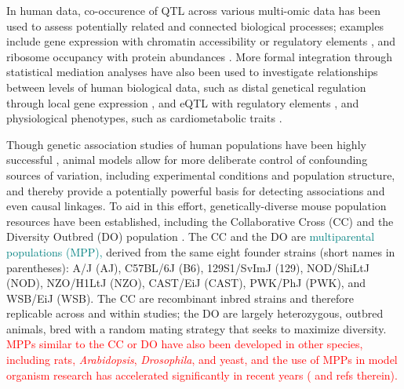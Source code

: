 \documentclass[10pt,letterpaper]{article}
\newcommand{\WVinline}[1]{\textcolor{red}{#1}}
\newcommand{\GKinline}[1]{\textcolor{teal}{#1}}
\begin{document}
In human data, co-occurence of QTL across various multi-omic data has been used to assess potentially related and connected biological processes; examples include gene expression with chromatin accessibility \cite{Degner2012} or regulatory elements \cite{Pai2015},  and ribosome occupancy with protein abundances \cite{Battle2015}.
More formal integration through statistical mediation analyses have also been used to investigate relationships between levels of human biological data, such as distal genetical regulation through local gene expression \cite{Battle2014,Yang2017}, and eQTL with regulatory elements \cite{Alasoo2017, Roytman2018, Wu2018}, and physiological phenotypes, such as cardiometabolic traits \cite{Raulerson2019}.

Though genetic association studies of human populations have been highly successful \cite{Visscher2017}, animal models allow for more deliberate control of confounding sources of variation, including experimental conditions and population structure, and thereby provide a potentially powerful basis for detecting associations and even causal linkages.
To aid in this effort, genetically-diverse mouse population resources have been established, including the Collaborative Cross (CC) \cite{Churchill2004,Hall2012,Srivastava2017} and the Diversity Outbred (DO) population \cite{Churchill2012}. The CC and the DO are \GKinline{multiparental populations (MPP),} derived from the same eight founder strains (short names in parentheses): A/J (AJ), C57BL/6J (B6), 129S1/SvImJ (129), NOD/ShiLtJ (NOD), NZO/H1LtJ (NZO), CAST/EiJ (CAST), PWK/PhJ (PWK), and WSB/EiJ (WSB). The CC are recombinant inbred strains and therefore replicable across and within studies; the DO are largely heterozygous, outbred animals, bred with a random mating strategy that seeks to maximize diversity. 
\WVinline{MPPs similar to the CC or DO have also been developed in other species, including rats, \textit{Arabidopsis}, \textit{Drosophila}, and yeast, and the use of MPPs in model organism research has accelerated significantly in recent years (\cite{DeKoning2017} and refs therein).}
\end{document}
